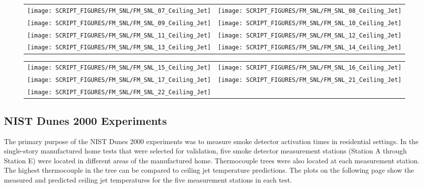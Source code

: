 \begin{figure}[p]
\begin{tabular*}{\textwidth}{l@{\extracolsep{\fill}}r}
\texttt{[image: SCRIPT\_FIGURES/FM\_SNL/FM\_SNL\_07\_Ceiling\_Jet]} &
\texttt{[image: SCRIPT\_FIGURES/FM\_SNL/FM\_SNL\_08\_Ceiling\_Jet]} \\
\texttt{[image: SCRIPT\_FIGURES/FM\_SNL/FM\_SNL\_09\_Ceiling\_Jet]} &
\texttt{[image: SCRIPT\_FIGURES/FM\_SNL/FM\_SNL\_10\_Ceiling\_Jet]} \\
\texttt{[image: SCRIPT\_FIGURES/FM\_SNL/FM\_SNL\_11\_Ceiling\_Jet]} &
\texttt{[image: SCRIPT\_FIGURES/FM\_SNL/FM\_SNL\_12\_Ceiling\_Jet]} \\
\texttt{[image: SCRIPT\_FIGURES/FM\_SNL/FM\_SNL\_13\_Ceiling\_Jet]} &
\texttt{[image: SCRIPT\_FIGURES/FM\_SNL/FM\_SNL\_14\_Ceiling\_Jet]} \\
\end{tabular*}
\label{FM_SNL_Ceiling_Jet_2}
\end{figure}

\begin{figure}[p]
\begin{tabular*}{\textwidth}{l@{\extracolsep{\fill}}r}
\texttt{[image: SCRIPT\_FIGURES/FM\_SNL/FM\_SNL\_15\_Ceiling\_Jet]} &
\texttt{[image: SCRIPT\_FIGURES/FM\_SNL/FM\_SNL\_16\_Ceiling\_Jet]} \\
\texttt{[image: SCRIPT\_FIGURES/FM\_SNL/FM\_SNL\_17\_Ceiling\_Jet]} &
\texttt{[image: SCRIPT\_FIGURES/FM\_SNL/FM\_SNL\_21\_Ceiling\_Jet]} \\
\texttt{[image: SCRIPT\_FIGURES/FM\_SNL/FM\_SNL\_22\_Ceiling\_Jet]} \\
\end{tabular*}
\label{FM_SNL_Ceiling_Jet_3}
\end{figure}


\clearpage

\subsection{NIST Dunes 2000 Experiments}

The primary purpose of the NIST Dunes 2000 experiments was to measure smoke detector activation times in residential settings. In the single-story manufactured home tests that were selected for validation, five smoke detector measurement stations (Station A through Station E) were located in different areas of the manufactured home. Thermocouple trees were also located at each measurement station. The highest thermocouple in the tree can be compared to ceiling jet temperature predictions. The plots on the following page show the measured and predicted ceiling jet temperatures for the five measurement stations in each test.

